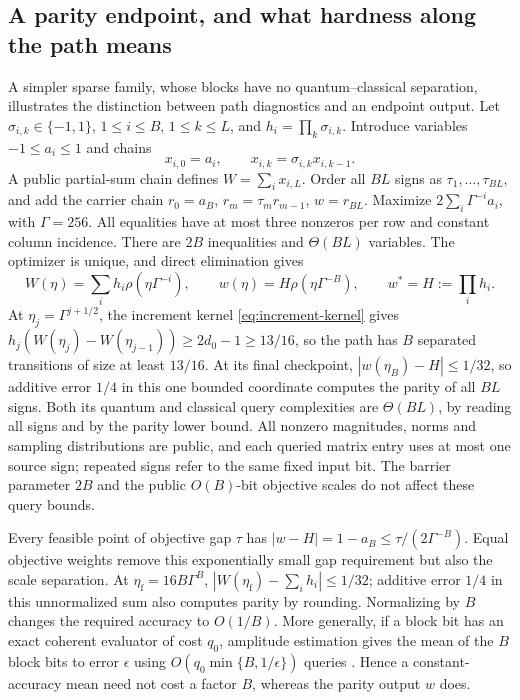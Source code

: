 \subsection{A parity endpoint, and what hardness along the path means}
A simpler sparse family, whose blocks have no quantum--classical
separation, illustrates the distinction between path diagnostics and an
endpoint output.  Let $\sigma_{i,k}\in\{-1,1\}$,
$1\leq i\leq B$, $1\leq k\leq L$, and
$h_i=\prod_k\sigma_{i,k}$.  Introduce variables
$-1\leq a_i\leq1$ and chains
\[
 x_{i,0}=a_i,\qquad x_{i,k}=\sigma_{i,k}x_{i,k-1}.
\]
A public partial-sum chain defines $W=\sum_i x_{i,L}$.
Order all $BL$ signs as $\tau_1,\ldots,\tau_{BL}$, and add the carrier
chain $r_0=a_B$,
$r_m=\tau_m r_{m-1}$, $w=r_{BL}$.
Maximize $2\sum_i\Gamma^{-i}a_i$, with $\Gamma=256$.
All equalities have at most three nonzeros per row and constant column
incidence.  There are $2B$ inequalities and $\Theta(BL)$ variables.
The optimizer is unique, and direct elimination gives
\begin{equation}\label{eq:parity-path}
 W(\eta)=\sum_i h_i\rho(\eta\Gamma^{-i}),\qquad
 w(\eta)=H\rho(\eta\Gamma^{-B}),\qquad
 w^*=H:=\prod_i h_i.
\end{equation}
At $\eta_j=\Gamma^{j+1/2}$, the increment kernel
\eqref{eq:increment-kernel} gives
$h_j(W(\eta_j)-W(\eta_{j-1}))\geq2d_0-1\geq13/16$, so the path has $B$
separated transitions of size at least $13/16$.
At its final checkpoint,
$|w(\eta_B)-H|\leq1/32$, so additive error $1/4$ in this one bounded
coordinate computes the parity of all $BL$ signs.  Both its quantum and
classical query complexities are $\Theta(BL)$, by reading all signs and
by the parity lower bound.
All nonzero magnitudes, norms and sampling distributions are public, and each
queried matrix entry uses at most one source sign; repeated signs refer
to the same fixed input bit.  The barrier parameter $2B$ and
the public $O(B)$-bit objective scales do not affect these query bounds.

Every feasible point of objective gap $\tau$ has
$|w-H|=1-a_B\leq\tau/(2\Gamma^{-B})$.  Equal objective weights remove
this exponentially small gap requirement but also the scale
separation.  At $\eta_{\mathrm f}=16B\Gamma^B$,
$|W(\eta_{\mathrm f})-\sum_i h_i|\leq1/32$; additive error $1/4$ in
this unnormalized sum also computes parity by rounding.  Normalizing by
$B$ changes the required accuracy to $O(1/B)$.
More generally, if a block bit has an exact coherent evaluator of cost
$q_0$, amplitude estimation gives the mean of the $B$ block bits to
error $\epsilon$ using $O(q_0\min\{B,1/\epsilon\})$ queries
\citep{BrassardEtAl2002}.  Hence a constant-accuracy mean need not cost a
factor $B$, whereas the parity output $w$ does.

